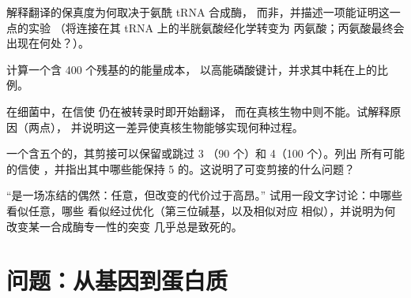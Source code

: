 \begin{exercise}[$\star\star$]\label{exo:b1:gene-expression:8}
解释翻译的保真度为何取决于氨酰 tRNA 合成酶，
而非，并描述一项能证明这一点的实验
（将连接在其 tRNA 上的半胱氨酸经化学转变为
丙氨酸；丙氨酸最终会出现在何处？）。
\end{exercise}

\begin{exercise}[$\star\star$]\label{exo:b1:gene-expression:9}
计算一个含 \qty{400}{} 个残基的的能量成本，
以高能磷酸键计，并求其中耗在上的比例。
\end{exercise}

\begin{exercise}[$\star\star\star$]\label{exo:b1:gene-expression:10}
在细菌中，在信使  仍在被转录时即开始翻译，
而在真核生物中则不能。试解释原因（两点），
并说明这一差异使真核生物能够实现何种过程。
\end{exercise}

\begin{exercise}[$\star\star\star$]\label{exo:b1:gene-expression:11}
一个含五个的，其剪接可以保留或跳过 3
（\qty{90}{} 个）和 4（\qty{100}{} 个）。列出
所有可能的信使 ，并指出其中哪些能保持
 5 的。这说明了可变剪接的什么问题？
\end{exercise}

\begin{exercise}[$\star\star\star$]\label{exo:b1:gene-expression:12}
“是一场冻结的偶然：任意，但改变的代价过于高昂。”
试用一段文字讨论：中哪些看似任意，哪些
看似经过优化（第三位碱基，以及相似对应
相似），并说明为何改变某一合成酶专一性的突变
几乎总是致死的。
\end{exercise}

\section{问题：从基因到蛋白质}

